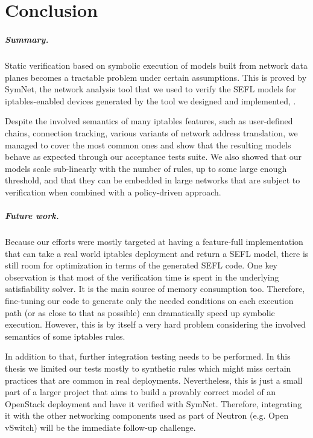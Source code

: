 \chapter{Conclusion}

\paragraph{Summary.} Static verification based on symbolic execution of models
built from network data planes becomes a tractable problem under certain
assumptions.  This is proved by SymNet, the network analysis tool that we used
to verify the SEFL models for iptables-enabled devices generated by the tool we
designed and implemented, \TOOL.

Despite the involved semantics of many iptables features, such as user-defined
chains, connection tracking, various variants of network address translation,
we managed to cover the most common ones and show that the resulting models
behave as expected through our acceptance tests suite.  We also showed that our
models scale sub-linearly with the number of rules, up to some large enough
threshold, and that they can be embedded in large networks that are subject to
verification when combined with a policy-driven approach.

\paragraph{Future work.}
Because our efforts were mostly targeted at having a feature-full
implementation that can take a real world iptables deployment and return a SEFL
model, there is still room for optimization in terms of the generated SEFL
code.  One key observation is that most of the verification time is spent in
the underlying satisfiability solver.  It is the main source of memory
consumption too.  Therefore, fine-tuning our code to generate only the needed
conditions on each execution path (or as close to that as possible) can
dramatically speed up symbolic execution.  However, this is by itself a very
hard problem considering the involved semantics of some iptables rules.

In addition to that, further integration testing needs to be performed.  In
this thesis we limited our tests mostly to synthetic rules which might miss
certain practices that are common in real deployments.  Nevertheless, this is
just a small part of a larger project that aims to build a provably correct
model of an OpenStack deployment and have it verified with SymNet.  Therefore,
integrating it with the other networking components used as part of Neutron
(e.g. Open vSwitch) will be the immediate follow-up challenge.
